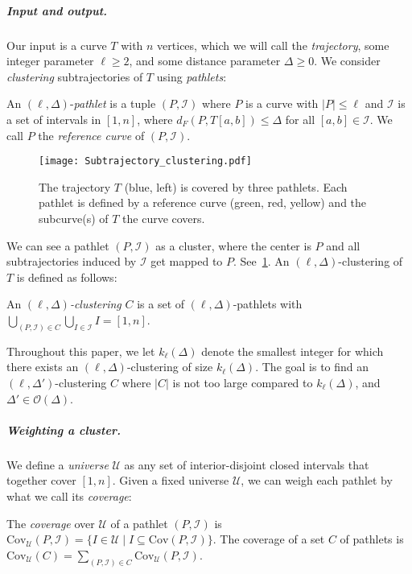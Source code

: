 \documentclass[a4paper,UKenglish,cleveref,thm-restate,notab]{lipics-v2021}
\newcommand{\dF}{\ensuremath{d_F}}
\newcommand{\bigO}{\mathcal{O}}
\newcommand{\I}{\mathcal{I}}
\newcommand{\U}{\mathcal{U}}
\newcommand{\Cov}{\ensuremath{\mathrm{Cov}}}
\begin{document}
\subparagraph*{Input and output.}
    Our input is a curve $T$ with $n$ vertices, which we will call the \emph{trajectory}, some integer parameter $\ell \geq 2$,
    and some distance parameter $\Delta \geq 0$.
    We consider \emph{clustering} subtrajectories of $T$ using \emph{pathlets}:
    
    \begin{definition}[Pathlet]
        An $(\ell, \Delta)$-\emph{pathlet} is a tuple $(P, \I)$ where $P$ is a curve with $|P| \leq \ell$ and $\I$ is a set of intervals in $[1, n]$, where $\dF(P, T[a, b]) \leq \Delta$ for all $[a, b] \in \I$.
        We call $P$ the \emph{reference curve} of $(P, \I)$.
\end{definition}

    \begin{figure}[b]
        \centering
        \texttt{[image: Subtrajectory\_clustering.pdf]}
        \caption{The trajectory $T$ (blue, left) is covered by three pathlets.
        Each pathlet is defined by a reference curve (green, red, yellow) and the subcurve(s) of $T$ the curve covers.
        }
        \label{fig:subtrajectory_clustering}
    \end{figure}

   We can see a pathlet $(P, \I)$ as a cluster, where the center is $P$ and all subtrajectories induced by $\I$ get mapped to $P$.
    See~\cref{fig:subtrajectory_clustering}.
    An $(\ell, \Delta)$-clustering of $T$ is defined as follows:

    \begin{definition}
        \label{def:cluster}
        An \emph{$(\ell, \Delta)$-clustering} $C$ is a set of $(\ell, \Delta)$-pathlets with $\bigcup\limits_{(P, \I) \in C} \bigcup\limits_{I \in \I} I=  [1, n]$.
    \end{definition}

    \noindent
    Throughout this paper, we let $k_\ell(\Delta)$ denote the smallest integer for which there exists an $(\ell, \Delta)$-clustering of size $k_\ell(\Delta)$.
    The goal is to find an $(\ell, \Delta')$-clustering $C$ where $|C|$ is not too large compared to $k_\ell(\Delta)$, and $\Delta' \in \bigO(\Delta)$.

\subparagraph{Weighting a cluster.}
We define a \emph{universe} $\U$ as any set of interior-disjoint closed intervals that together cover $[1, n]$. 
Given a fixed universe $\U$, we can weigh each pathlet by what we call its \emph{coverage}:

\begin{definition}
    The \emph{coverage} over $\U$ of a pathlet $(P, \I)$ is $\Cov_\U(P, \I) = \{I \in \U \mid I \subseteq \Cov(P, \I)\}$.
    The coverage of a set $C$ of pathlets is $\Cov_\U(C) = \sum_{(P, \I) \in C} \Cov_\U(P, \I)$.
\end{definition}
\end{document}
